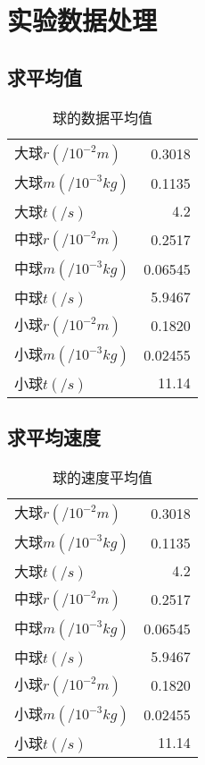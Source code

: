 \documentclass{article}
\begin{document}
\section{实验数据处理}

\subsection*{求平均值}

\begin{table}[!hbtp]
    \begin{center}
    \caption{球的数据平均值}
    \begin{tabular}{l|r}

        \hline
        大球$r(/10^{-2}m)$ & 0.3018 \\
        大球$m(/10^{-3}kg)$ & 0.1135 \\
        大球$t(/s)$ & 4.2 \\
        中球$r(/10^{-2}m)$ & 0.2517 \\
        中球$m(/10^{-3}kg)$ & 0.06545 \\
        中球$t(/s)$ & 5.9467 \\
        小球$r(/10^{-2}m)$ & 0.1820 \\
        小球$m(/10^{-3}kg)$ & 0.02455 \\
        小球$t(/s)$ & 11.14 \\

    \end{tabular}
    \end{center}
\end{table}

\subsection*{求平均速度}

\begin{table}[!hbtp]
    \begin{center}
    \caption{球的速度平均值}
    \begin{tabular}{l|r}

        \hline
        大球$r(/10^{-2}m)$ & 0.3018 \\
        大球$m(/10^{-3}kg)$ & 0.1135 \\
        大球$t(/s)$ & 4.2 \\
        中球$r(/10^{-2}m)$ & 0.2517 \\
        中球$m(/10^{-3}kg)$ & 0.06545 \\
        中球$t(/s)$ & 5.9467 \\
        小球$r(/10^{-2}m)$ & 0.1820 \\
        小球$m(/10^{-3}kg)$ & 0.02455 \\
        小球$t(/s)$ & 11.14 \\

    \end{tabular}
    \end{center}
\end{table}
\end{document}
